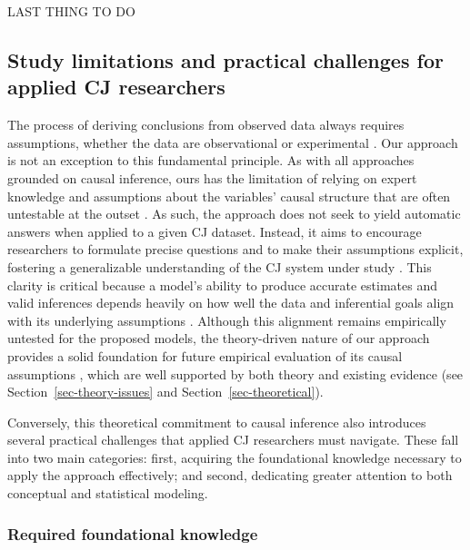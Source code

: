 \documentclass[
  authoryear,
  review,
  1p]{elsarticle}
\begin{document}
{LAST THING TO DO}

\subsection{Study limitations and practical challenges for applied CJ
researchers}\label{sec-discussion_challenges}

The process of deriving conclusions from observed data always requires
assumptions, whether the data are observational or experimental
\citep{Kohler_et_al_2019, Deffner_et_al_2022}. Our approach is not an
exception to this fundamental principle. As with all approaches grounded
on causal inference, ours has the limitation of relying on expert
knowledge and assumptions about the variables' causal structure that are
often untestable at the outset \citep{Hernan_et_al_2025}. As such, the
approach does not seek to yield automatic answers when applied to a
given CJ dataset. Instead, it aims to encourage researchers to formulate
precise questions and to make their assumptions explicit, fostering a
generalizable understanding of the CJ system under study
\citep{Rohrer_et_al_2022, Deffner_et_al_2022, Sterner_et_al_2024}. This
clarity is critical because a model's ability to produce accurate
estimates and valid inferences depends heavily on how well the data and
inferential goals align with its underlying assumptions
\citep{Kohler_et_al_2019}. Although this alignment remains empirically
untested for the proposed models, the theory-driven nature of our
approach provides a solid foundation for future empirical evaluation of
its causal assumptions \citep{Deffner_et_al_2022}, which are well
supported by both theory and existing evidence (see
Section~\ref{sec-theory-issues} and Section~\ref{sec-theoretical}).

Conversely, this theoretical commitment to causal inference also
introduces several practical challenges that applied CJ researchers must
navigate. These fall into two main categories: first, acquiring the
foundational knowledge necessary to apply the approach effectively; and
second, dedicating greater attention to both conceptual and statistical
modeling.

\subsubsection{Required foundational
knowledge}\label{sec-discussion_challenges1}
\end{document}
